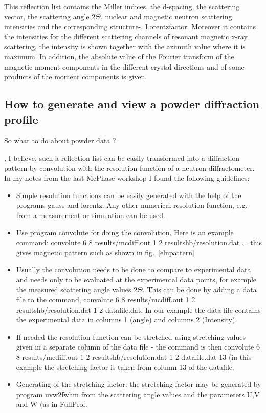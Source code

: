 This reflection list contains the Miller indices, the d-spacing, the scattering vector,
the scattering angle 2$\Theta$, nuclear and magnetic neutron scattering intensities
and the corresponding structure-, Lorentzfactor. Moreover it contains the
intensities for the different scattering channels of resonant magnetic x-ray scattering,
the intensity is shown together with the azimuth value where it is maximum. In addition,
the absolute value of the Fourier transform of the magnetic moment components in the different
crystal directions and of some products of the moment components is given.

\subsection{How to generate and view a powder diffraction profile}

\PP So what to do about powder data ? 

\OO \pp, I believe, such a reflection list can be easily transformed into a diffraction pattern
by convolution with the resolution function of a neutron diffractometer. In my notes
from the last {\prg McPhase} workshop I found the following guidelines:

\begin{itemize}
\item
Simple resolution functions can be easily generated with the help of the programs
{\prg gauss} and {\prg lorentz}. Any other numerical
resolution function, e.g. from a measurement or simulation can be used.
\item
Use program  {\prg convolute} for doing the convolution. 
Here is an example command: 
{\prg convolute 6 8  results/mcdiff.out
1 2 resultshb/resolution.dat}
... this gives magnetic pattern such as shown in fig.~\ref{elnpattern}
\item Usually the convolution needs to be done to compare to experimental
data and needs only to be evaluated at the experimental data points, for
example the measured scattering angle values $2\Theta$. This can be 
done by adding a data file to the command,
{\prg convolute 6 8  results/mcdiff.out
1 2 resultshb/resolution.dat 1 2 datafile.dat}. In our example the
data file contains the experimental data in columns 1 (angle) and columns 2 (Intensity).
\item If needed the resolution function can be stretched using stretching
values given in a separate column of the data file - the command is then
{\prg convolute 6 8  results/mcdiff.out
1 2 resultshb/resolution.dat 1 2 datafile.dat 13} (in this example the stretching
factor is taken from column 13 of the datafile.
\item Generating of the stretching factor: the stretching factor
may be generated by program {\prg uvw2fwhm} from
the scattering angle values and the parameters U,V and W (as in {\prg FullProf}.

\end{itemize}

